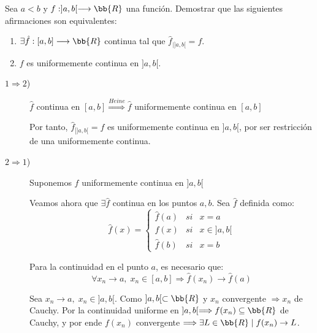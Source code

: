 \begin{ejercicio} \label{Ej6}
    Sea $a<b$ y $f:]a,b[ \longrightarrow \bb{R}$ una función. Demostrar que las siguientes afirmaciones son equivalentes:
    \begin{enumerate}
        \item $\exists \hat{f}:[a,b]\longrightarrow \bb{R}$ continua tal que $\hat{f}_{\big|]a,b[}=f$.
        \item $f$ es uniformemente continua en $]a,b[$.
    \end{enumerate}

    \begin{description}
    \item [$1 \Longrightarrow 2$)]
     $\hat{f}$ continua en $[a,b] \stackrel{Heine}{\Longrightarrow} \hat{f}$ uniformemente continua en $[a,b]$
     
     Por tanto, $\hat{f}_{\left|]a, b[\right.}=f$ es uniformemente continua en $]a,b[$, por ser restricción de una uniformemente continua.
    
    \item [$2 \Longrightarrow 1$)] Suponemos $f$ uniformemente continua en $]a,b[$
    
    Veamos ahora que $\exists \hat{f}$ continua en los puntos $a,b$.
    Sea $\hat{f}$ definida como:
    \begin{equation*}
        \hat{f}(x)=\left\{
        \begin{array}{ccc}
            \hat{f}(a) & si &x=a\\
            f(x) & si &x\in ]a,b[ \\
            \hat{f}(b) & si &x=b
        \end{array}
        \right.
    \end{equation*}
    
    Para la continuidad en el punto $a$, es necesario que:
    \begin{equation*}
        \forall x_n\to a,\;x_n\in [a,b] \Longrightarrow \hat{f}(x_n)\to \hat{f}(a)
    \end{equation*}

    Sea $x_n\longrightarrow a,\;x_n\in]a,b[$. Como $]a,b[\subset \bb{R}$ y $x_n$ convergente $\Longrightarrow x_n$ de Cauchy. Por la continuidad uniforme en $]a,b[\Longrightarrow f(x_n)\subseteq\bb{R}$ de Cauchy, y por ende $f(x_n)$ convergente $\Longrightarrow \exists L\in \bb{R}\mid f(x_n)\to L$.


\end{description}
\end{ejercicio}

